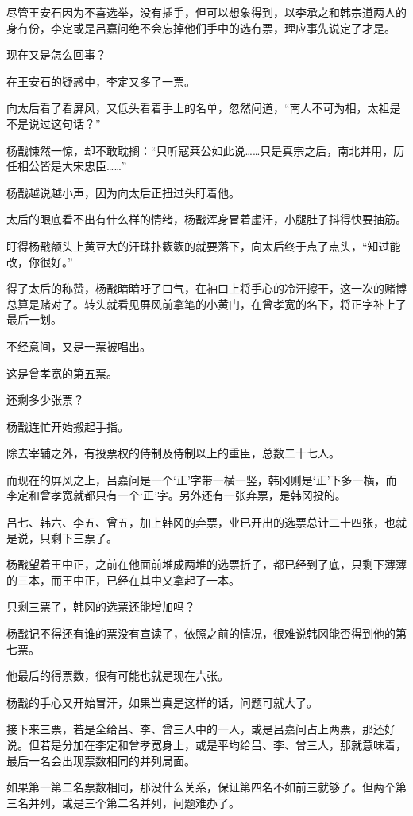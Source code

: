 尽管王安石因为不喜选举，没有插手，但可以想象得到，以李承之和韩宗道两人的身冇份，李定或是吕嘉问绝不会忘掉他们手中的选冇票，理应事先说定了才是。

现在又是怎么回事？

在王安石的疑惑中，李定又多了一票。

向太后看了看屏风，又低头看着手上的名单，忽然问道，“南人不可为相，太祖是不是说过这句话？”

杨戬悚然一惊，却不敢耽搁：“只听寇莱公如此说……只是真宗之后，南北并用，历任相公皆是大宋忠臣……”

杨戬越说越小声，因为向太后正扭过头盯着他。

太后的眼底看不出有什么样的情绪，杨戬浑身冒着虚汗，小腿肚子抖得快要抽筋。

盯得杨戬额头上黄豆大的汗珠扑簌簌的就要落下，向太后终于点了点头，“知过能改，你很好。”

得了太后的称赞，杨戬暗暗吁了口气，在袖口上将手心的冷汗擦干，这一次的赌博总算是赌对了。转头就看见屏风前拿笔的小黄门，在曾孝宽的名下，将正字补上了最后一划。

不经意间，又是一票被唱出。

这是曾孝宽的第五票。

还剩多少张票？

杨戬连忙开始搬起手指。

除去宰辅之外，有投票权的侍制及侍制以上的重臣，总数二十七人。

而现在的屏风之上，吕嘉问是一个‘正’字带一横一竖，韩冈则是‘正’下多一横，而李定和曾孝宽就都只有一个‘正’字。另外还有一张弃票，是韩冈投的。

吕七、韩六、李五、曾五，加上韩冈的弃票，业已开出的选票总计二十四张，也就是说，只剩下三票了。

杨戬望着王中正，之前在他面前堆成两堆的选票折子，都已经到了底，只剩下薄薄的三本，而王中正，已经在其中又拿起了一本。

只剩三票了，韩冈的选票还能增加吗？

杨戬记不得还有谁的票没有宣读了，依照之前的情况，很难说韩冈能否得到他的第七票。

他最后的得票数，很有可能也就是现在六张。

杨戬的手心又开始冒汗，如果当真是这样的话，问题可就大了。

接下来三票，若是全给吕、李、曾三人中的一人，或是吕嘉问占上两票，那还好说。但若是分加在李定和曾孝宽身上，或是平均给吕、李、曾三人，那就意味着，最后一名会出现票数相同的并列局面。

如果第一第二名票数相同，那没什么关系，保证第四名不如前三就够了。但两个第三名并列，或是三个第二名并列，问题难办了。

